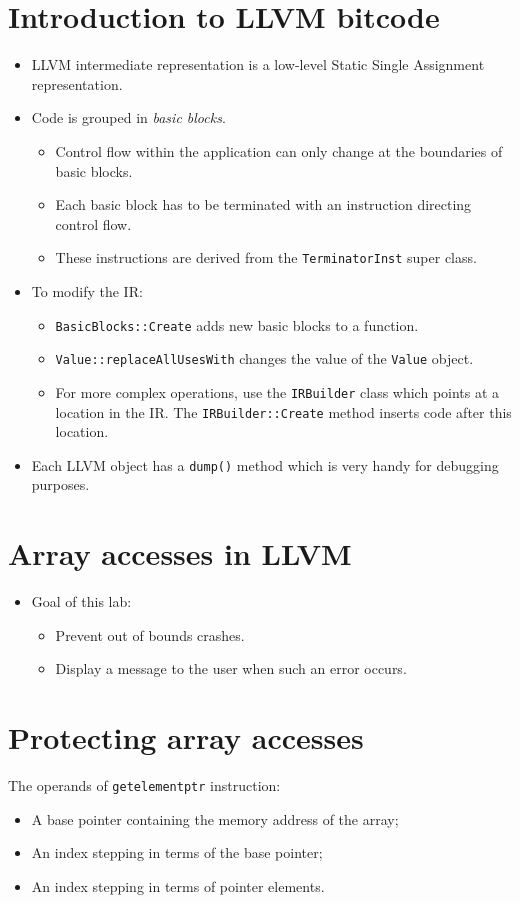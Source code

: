 \documentclass{report}
\begin{document}
\section{Introduction to LLVM bitcode}
\begin{itemize}
	\item LLVM intermediate representation is a low-level Static Single Assignment representation.
	\item Code is grouped in \textit{basic blocks}.
	\begin{itemize}
		\item Control flow within the application can only change at the boundaries of basic blocks.
		\item Each basic block has to be terminated with an instruction directing control flow.
		\item These instructions are derived from the \texttt{TerminatorInst} super class.
	\end{itemize}
	\item To modify the IR:
	\begin{itemize}
		\item \texttt{BasicBlocks::Create} adds new basic blocks to a function.
		\item \texttt{Value::replaceAllUsesWith} changes the value of the \texttt{Value} object.
		\item For more complex operations, use the \texttt{IRBuilder} class which points at a location in the IR. The \texttt{IRBuilder::Create} method inserts code after this location.
	\end{itemize}
	\item Each LLVM object has a \texttt{dump()} method which is very handy for debugging purposes.
\end{itemize}
\section{Array accesses in LLVM}
\begin{itemize}
	\item Goal of this lab:
	\begin{itemize}
		\item Prevent out of bounds crashes.
		\item Display a message to the user when such an error occurs.
	\end{itemize}
\end{itemize}
\section{Protecting array accesses}
The operands of \texttt{getelementptr} instruction:
\begin{itemize}
	\item A base pointer containing the memory address of the array;
	\item An index stepping in terms of the base pointer;
	\item An index stepping in terms of pointer elements.
\end{itemize}
\end{document}
